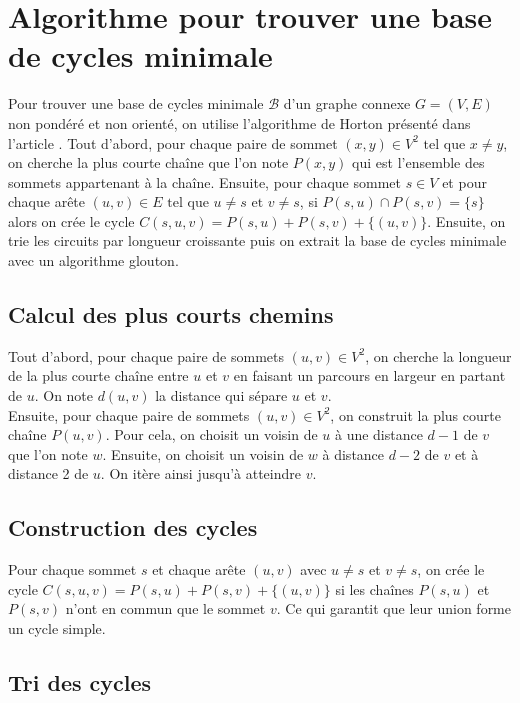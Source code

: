 \documentclass{article}
\begin{document}
\section{Algorithme pour trouver une base de cycles minimale}

Pour trouver une base de cycles minimale $\mathcal{B}$ d'un graphe connexe $G=(V,E)$ non pondéré et non orienté, on utilise l'algorithme de Horton présenté dans l'article \cite{Horton1984}. Tout d'abord, pour chaque paire de sommet $(x,y) \in V^2 \text{ tel que } x \neq y$, on cherche la plus courte chaîne que l'on note $P(x,y)$ qui est l'ensemble des sommets appartenant à la chaîne. Ensuite, pour chaque sommet $s \in V$ et pour chaque arête $(u,v) \in E \text{ tel que } u \neq s \text{ et } v \neq s$, si $P(s,u) \cap P(s,v) = \{s\}$ alors on crée le cycle $C(s,u,v) = P(s,u) + P(s,v) + \{(u,v)\}$. Ensuite, on trie les circuits par longueur croissante puis on extrait la base de cycles minimale avec un algorithme glouton.

\subsection{Calcul des plus courts chemins}\label{pcc}

Tout d'abord, pour chaque paire de sommets $(u, v) \in V^2$, on cherche la longueur de la plus courte chaîne entre $u$ et $v$ en faisant un parcours en largeur en partant de $u$. On note $d(u,v)$ la distance qui sépare $u$ et $v$. \\
Ensuite, pour chaque paire de sommets $(u, v) \in V^2$, on construit la plus courte chaîne $P(u,v)$. Pour cela, on choisit un voisin de $u$ à une distance $d-1$ de $v$ que l'on note $w$. Ensuite, on choisit un voisin de $w$ à distance $d-2$ de $v$ et à distance 2 de $u$. On itère ainsi jusqu'à atteindre $v$.


\subsection{Construction des cycles}

Pour chaque sommet $s$ et chaque arête $(u,v)$ avec $u \neq s$ et $v \neq s$, on crée le cycle $C(s,u,v) = P(s,u) + P(s,v) + \{(u,v)\}$ si les chaînes $P(s,u)$ et $P(s,v)$ n'ont en commun que le sommet $v$. Ce qui garantit que leur union forme un cycle simple.

\subsection{Tri des cycles}
\end{document}
